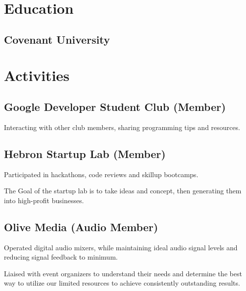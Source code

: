 \documentclass[]{openfont}
\begin{document}
\hfill
\begin{minipage}[t]{0.33\textwidth} 
\section{Education} 

\subsection{Covenant University}

\sectionsep




\section{Activities}
\subsection{ Google Developer Student Club (Member) }
\vspace{\topsep}
\begin{tightemize}
\item Interacting with other club members, sharing programming tips and resources.
\end{tightemize}
\sectionsep

\subsection{ Hebron Startup Lab (Member) }
\vspace{\topsep}
\begin{tightemize}
\item Participated in hackathons, code reviews and skillup bootcamps.
\item The Goal of the startup lab is to take ideas and concept, then generating them into high-profit businesses.
\end{tightemize}
\sectionsep

\subsection{ Olive Media (Audio Member) }
\vspace{\topsep}
\begin{tightemize}
\item Operated digital audio mixers, while maintaining ideal audio signal levels and reducing signal feedback to minimum.
\item Liaised with event organizers to understand their needs and determine the best way to utilize our limited resources to achieve consistently outstanding results.
\end{tightemize}
\sectionsep






\end{minipage}
\end{document}

